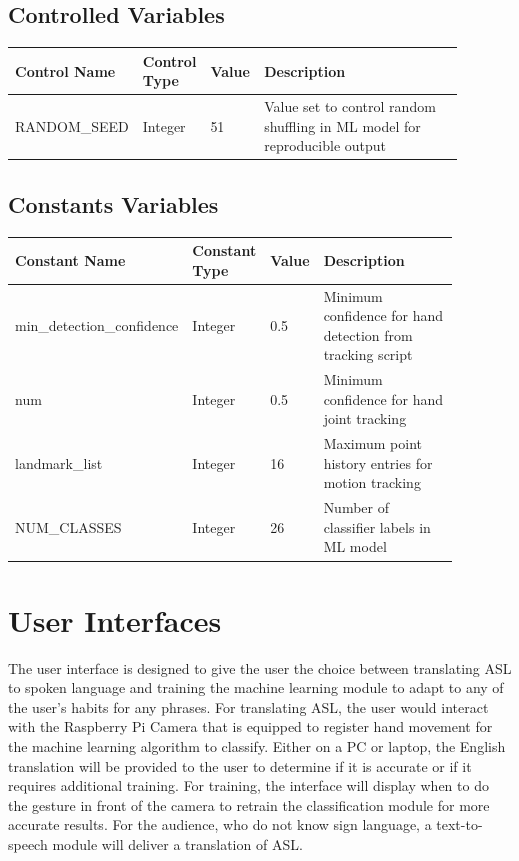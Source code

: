 \documentclass[12pt, titlepage]{article}
\begin{document}
\subsection{Controlled Variables}

\renewcommand{\arraystretch}{1.2}
\noindent \begin{tabularx}{\textwidth}{p{0.2\linewidth}|p{0.12\linewidth}|p{0.12\linewidth}|p{0.45\linewidth}}
\toprule
\textbf{Control Name} & \textbf{Control Type} & \textbf{Value} & \textbf{Description}\\
\midrule
RANDOM\_SEED & Integer & 51 & Value set to control random shuffling in ML model for reproducible output\\
\bottomrule
\end{tabularx}

\subsection{Constants Variables}

\renewcommand{\arraystretch}{1.2}
\noindent \begin{tabularx}{\textwidth}{p{0.28\linewidth}|p{0.12\linewidth}|p{0.08\linewidth}|p{0.4\linewidth}}
\toprule
\textbf{Constant Name} & \textbf{Constant Type} & \textbf{Value} & \textbf{Description}\\
\midrule
min\_detection\_confidence & Integer & 0.5 & Minimum confidence for hand detection from tracking script\\
\hline
num & Integer & 0.5 & Minimum confidence for hand joint tracking\\
\hline
landmark\_list & Integer & 16 & Maximum point history entries for motion tracking\\
\hline
NUM\_CLASSES & Integer & 26 & Number of classifier labels in ML model\\
\bottomrule
\end{tabularx}

\section{User Interfaces}

The user interface is designed to give the user the choice between translating ASL to spoken language and training the machine learning module to adapt 
to any of the user’s habits for any phrases. For translating ASL, the user would interact with the Raspberry Pi Camera that is equipped to register hand 
movement for the machine learning algorithm to classify. Either on a PC or laptop, the English translation will be provided to the user to determine if 
it is accurate or if it requires additional training. For training, the interface will display when to do the gesture in front of the camera to retrain 
the classification module for more accurate results. For the audience, who do not know sign language, a text-to-speech module will deliver a translation of ASL.
\end{document}

